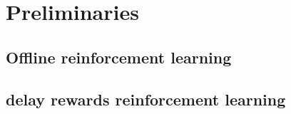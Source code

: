 \section{Preliminaries}\label{sec:prel}

\subsection{Offline reinforcement learning}



\subsection{delay rewards reinforcement learning}